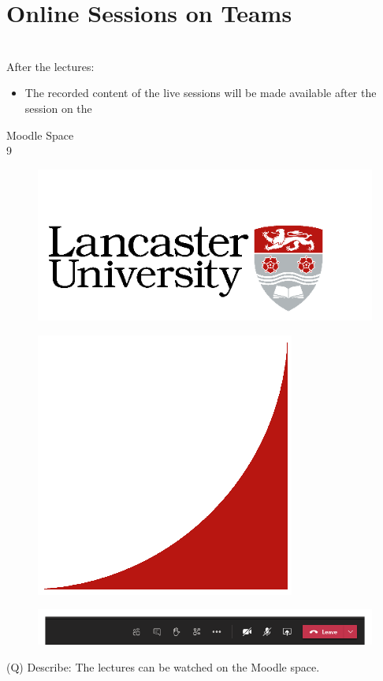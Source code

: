 \documentclass[12pt]{article}
\begin{document}
\section{Online Sessions on Teams}
\\
After the lectures:\\
\begin{itemize}
  \item The recorded content of the live sessions will be made available after the session on the 
\end{itemize}
Moodle Space\\
9\\
\begin{figure}[H]
\includegraphics[width=0.5\linewidth]{page9-image-1.png}
\end{figure}
\begin{figure}[H]
\includegraphics[width=0.5\linewidth]{page9-image-2.png}
\end{figure}
\begin{figure}[H]
\includegraphics[width=0.5\linewidth]{page9-image-3.png}
\end{figure}
\clearpage
(Q)
Describe: The lectures can be watched on the Moodle space.
\clearpage
\end{document}
